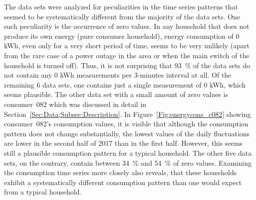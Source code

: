The data sets were analyzed for peculiarities in the time series patterns that seemed to be systematically different from the majority of the data sets. One such peculiarity is the occurrence of zero values. In any household that does not produce its own energy (pure consumer household), energy consumption of 0 kWh, even only for a very short period of time, seems to be very unlikely (apart from the rare case of a power outage in the area or when the main switch of the household is turned off). Thus, it is not surprising that 93~\% of the data sets do not contain any 0 kWh measurements per 3-minutes interval at all. Of the remaining 6 data sets, one contains just a single measurement of 0 kWh, which seems plausible. The other data set with a small amount of zero values is consumer~082 which was discussed in detail in Section~\ref{Sec:Data;Subsec:Description}. In Figure~\ref{Fig:energycons_c082} showing consumer~082's consumption values, it is visible that although the consumption pattern does not change substantially, the lowest values of the daily fluctuations are lower in the second half of 2017 than in the first half. However, this seems still a plausible consumption pattern for a typical household. The other five data sets, on the contrary, contain between 34~\% and 54~\% of zero values. Examining the consumption time series more closely also reveals, that these households exhibit a systematically different consumption pattern than one would expect from a typical household.

